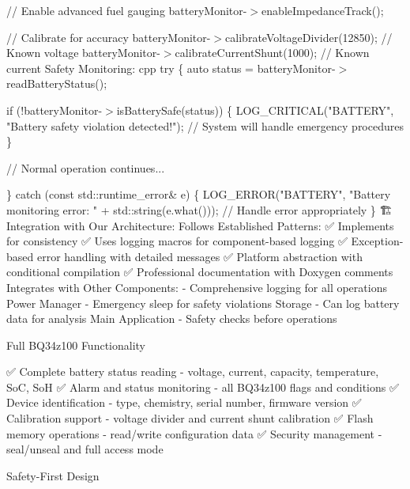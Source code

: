 // Enable advanced fuel gauging battery\+Monitor-\/\texorpdfstring{$>$}{>}enable\+Impedance\+Track();

// Calibrate for accuracy battery\+Monitor-\/\texorpdfstring{$>$}{>}calibrate\+Voltage\+Divider(12850); // Known voltage battery\+Monitor-\/\texorpdfstring{$>$}{>}calibrate\+Current\+Shunt(1000); // Known current Safety Monitoring\+: cpp try \{ auto status = battery\+Monitor-\/\texorpdfstring{$>$}{>}read\+Battery\+Status();

if (!battery\+Monitor-\/\texorpdfstring{$>$}{>}is\+Battery\+Safe(status)) \{ LOG\+\_\+\+CRITICAL("{}\+BATTERY"{}, "{}\+Battery safety violation detected!"{}); // System will handle emergency procedures \}

// Normal operation continues...

\} catch (const std\+::runtime\+\_\+error\& e) \{ LOG\+\_\+\+ERROR("{}\+BATTERY"{}, "{}\+Battery monitoring error\+: "{} + std\+::string(e.\+what())); // Handle error appropriately \} 🏗️ Integration with Our Architecture\+: Follows Established Patterns\+: ✅ Implements  for consistency ✅ Uses logging macros for component-\/based logging ✅ Exception-\/based error handling with detailed messages ✅ Platform abstraction with conditional compilation ✅ Professional documentation with Doxygen comments Integrates with Other Components\+:  -\/ Comprehensive logging for all operations Power Manager -\/ Emergency sleep for safety violations Storage -\/ Can log battery data for analysis Main Application -\/ Safety checks before operations


\begin{DoxyEnumerate}
\item Full BQ34z100 Functionality
\end{DoxyEnumerate}

✅ Complete battery status reading -\/ voltage, current, capacity, temperature, SoC, SoH ✅ Alarm and status monitoring -\/ all BQ34z100 flags and conditions ✅ Device identification -\/ type, chemistry, serial number, firmware version ✅ Calibration support -\/ voltage divider and current shunt calibration ✅ Flash memory operations -\/ read/write configuration data ✅ Security management -\/ seal/unseal and full access mode


\begin{DoxyEnumerate}
\item Safety-\/\+First Design
\end{DoxyEnumerate}

